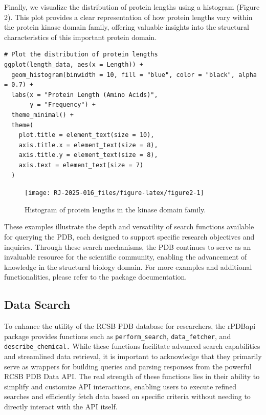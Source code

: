 Finally, we visualize the distribution of protein lengths using a histogram (Figure 2). This plot provides a clear representation of how protein lengths vary within the protein kinase domain family, offering valuable insights into the structural characteristics of this important protein domain.

\begin{verbatim}
# Plot the distribution of protein lengths
ggplot(length_data, aes(x = Length)) +
  geom_histogram(binwidth = 10, fill = "blue", color = "black", alpha = 0.7) +
  labs(x = "Protein Length (Amino Acids)",
       y = "Frequency") +
  theme_minimal() +
  theme(
    plot.title = element_text(size = 10),   
    axis.title.x = element_text(size = 8),  
    axis.title.y = element_text(size = 8),  
    axis.text = element_text(size = 7)      
  )
\end{verbatim}

\begin{figure}[H]
\texttt{[image: RJ-2025-016\_files/figure-latex/figure2-1]} \caption{Histogram of protein lengths in the kinase domain family.}\label{fig:figure2}
\end{figure}

These examples illustrate the depth and versatility of search functions available for querying the PDB, each designed to support specific research objectives and inquiries. Through these search mechanisms, the PDB continues to serve as an invaluable resource for the scientific community, enabling the advancement of knowledge in the structural biology domain. For more examples and additional functionalities, please refer to the package documentation.

\subsection{Data Search}\label{data-search}

To enhance the utility of the RCSB PDB database for researchers, the rPDBapi package provides functions such as \texttt{perform\_search}, \texttt{data\_fetcher}, and \texttt{describe\_chemical.} While these functions facilitate advanced search capabilities and streamlined data retrieval, it is important to acknowledge that they primarily serve as wrappers for building queries and parsing responses from the powerful RCSB PDB Data API. The real strength of these functions lies in their ability to simplify and customize API interactions, enabling users to execute refined searches and efficiently fetch data based on specific criteria without needing to directly interact with the API itself.

